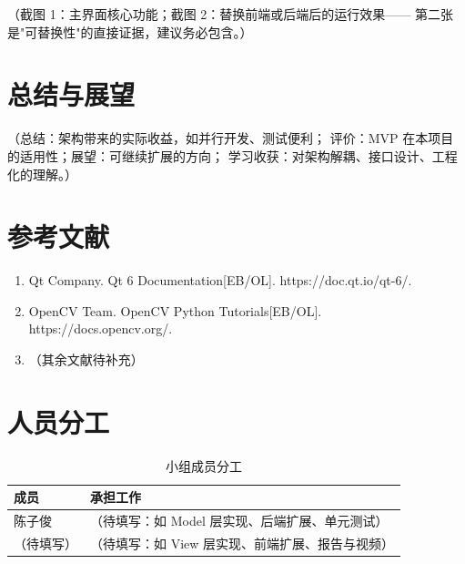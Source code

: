\documentclass[12pt,a4paper]{ctexart}
\begin{document}
%

（截图 1：主界面核心功能；截图 2：替换前端或后端后的运行效果——
第二张是"可替换性"的直接证据，建议务必包含。）

\section{总结与展望}\label{sec:conclusion}

（总结：架构带来的实际收益，如并行开发、测试便利；
评价：MVP 在本项目的适用性；展望：可继续扩展的方向；
学习收获：对架构解耦、接口设计、工程化的理解。）

\section*{参考文献}
\begin{enumerate}
    \item Qt Company. Qt 6 Documentation[EB/OL]. https://doc.qt.io/qt-6/.
    \item OpenCV Team. OpenCV Python Tutorials[EB/OL]. https://docs.opencv.org/.
    \item （其余文献待补充）
\end{enumerate}

\section*{人员分工}
\begin{table}[H]
    \centering
    \caption{小组成员分工}
    \label{tab:work}
    \begin{tabular}{ll}
        \toprule
        成员 & 承担工作 \\
        \midrule
        陈子俊 & （待填写：如 Model 层实现、后端扩展、单元测试） \\
        （待填写） & （待填写：如 View 层实现、前端扩展、报告与视频） \\
        \bottomrule
    \end{tabular}
\end{table}
\end{document}
